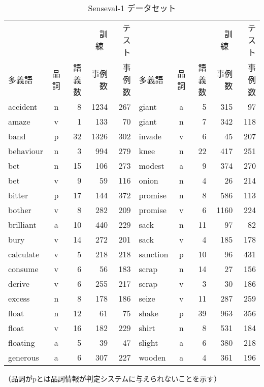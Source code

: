 \begin{table*}
  \caption{Senseval-1 データセット}
  
  \label{tab:senseval1}
\begin{center}
\renewcommand{\arraystretch}{}
\begin{tabular}{|lcrrr|lcrrr|} \hline
       &      &        & 訓練~  & テスト &
       &      &        & 訓練~  & テスト \\
多義語 & 品詞 & 語義数 & 事例数 & 事例数 &
多義語 & 品詞 & 語義数 & 事例数 & 事例数 \\
\hline
    accident & n &   8 & 1234 &  267 &        giant & a &   5 &  315 &   97 \\ 
       amaze & v &   1 &  133 &   70 &        giant & n &   7 &  342 &  118 \\ 
        band & p &  32 & 1326 &  302 &       invade & v &   6 &   45 &  207 \\ 
   behaviour & n &   3 &  994 &  279 &         knee & n &  22 &  417 &  251 \\ 
         bet & n &  15 &  106 &  273 &       modest & a &   9 &  374 &  270 \\ 
         bet & v &   9 &   59 &  116 &        onion & n &   4 &   26 &  214 \\ 
      bitter & p &  17 &  144 &  372 &      promise & n &   8 &  586 &  113 \\ 
      bother & v &   8 &  282 &  209 &      promise & v &   6 & 1160 &  224 \\ 
   brilliant & a &  10 &  440 &  229 &         sack & n &  11 &   97 &   82 \\ 
        bury & v &  14 &  272 &  201 &         sack & v &   4 &  185 &  178 \\ 
   calculate & v &   5 &  218 &  218 &     sanction & p &  10 &   96 &  431 \\ 
     consume & v &   6 &   56 &  183 &        scrap & n &  14 &   27 &  156 \\ 
      derive & v &   6 &  255 &  217 &        scrap & v &   3 &   30 &  186 \\ 
      excess & n &   8 &  178 &  186 &        seize & v &  11 &  287 &  259 \\ 
       float & n &  12 &   61 &   75 &        shake & p &  39 &  963 &  356 \\ 
       float & v &  16 &  182 &  229 &        shirt & n &   8 &  531 &  184 \\ 
    floating & a &   5 &   39 &   47 &       slight & a &   6 &  380 &  218 \\ 
    generous & a &   6 &  307 &  227 &       wooden & a &   4 &  361 &  196 \\ 
\hline
\end{tabular}
\end{center}
\vspace{0.5mm}
\begin{flushright}
（品詞がpとは品詞情報が判定システムに与えられないことを示す）
\end{flushright}
\end{table*}


